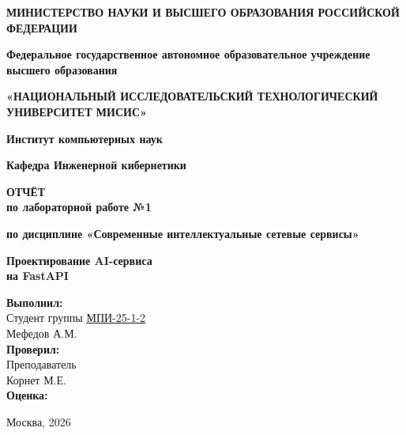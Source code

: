 \documentclass[12pt,a4paper]{article}
\begin{document}
\begin{titlepage}
    \begin{center}
        \textbf{МИНИСТЕРСТВО НАУКИ И ВЫСШЕГО ОБРАЗОВАНИЯ РОССИЙСКОЙ ФЕДЕРАЦИИ}
        \vspace{0.5cm}

        \textbf{Федеральное государственное автономное образовательное учреждение \\ высшего образования}
        \vspace{0.3cm}

        \textbf{«НАЦИОНАЛЬНЫЙ ИССЛЕДОВАТЕЛЬСКИЙ ТЕХНОЛОГИЧЕСКИЙ УНИВЕРСИТЕТ МИСИС»}
        \vspace{2cm}

        \textbf{Институт компьютерных наук}
        \vspace{0.3cm}

        \textbf{Кафедра Инженерной кибернетики}
        \vspace{1cm}

        \textbf{ОТЧЁТ}\\
        \textbf{по лабораторной работе №1}
        \vspace{0.3cm}

        \textbf{по дисциплине «Современные интеллектуальные сетевые сервисы»}
        \vspace{1.5cm}

        \huge{\textbf{Проектирование AI-сервиса \\ на FastAPI}}
        \vspace{2cm}
    \end{center}

    \begin{flushright}
        \textbf{Выполнил:} \\
        Студент группы \underline{МПИ-25-1-2} \\
        Мефедов А.М. \\
        \vspace{0.5cm}
        \textbf{Проверил:} \\
        Преподаватель \\
        Корнет М.Е. \\
        \vspace{2cm}
        \textbf{Оценка:} \hrulefill
    \end{flushright}

    \begin{center}
        \vfill
        Москва, 2026
    \end{center}
\end{titlepage}
\end{document}
